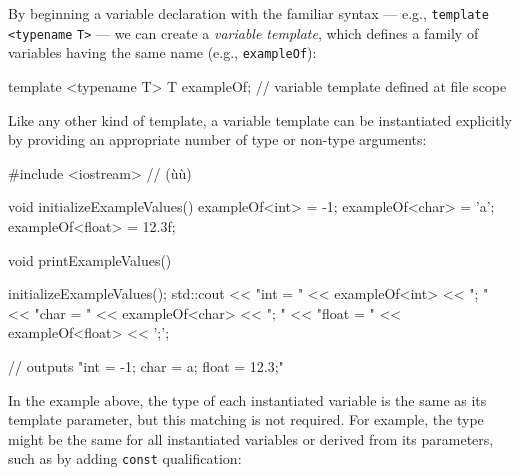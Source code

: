 By beginning a variable declaration with the familiar  syntax --- e.g., \lstinline!template! \lstinline!<typename! \lstinline!T>! --- we can create a \emph{variable template}, which defines a family of variables
having the same name (e.g., \lstinline!exampleOf!):

\begin{emcppslisting}[emcppsbatch=e1]
template <typename T> T exampleOf;  // variable template defined at file scope
\end{emcppslisting}

\noindent Like any other kind of template, a variable template can be instantiated explicitly by
providing an appropriate number of type or non-type arguments:

\begin{emcppslisting}[emcppsbatch=e1]
#include <iostream>  // (ù{}ù)

void initializeExampleValues()
{
    exampleOf<int>   = -1;
    exampleOf<char>  = 'a';
    exampleOf<float> = 12.3f;
}

void printExampleValues()
{
    initializeExampleValues();
    std::cout << "int = "   << exampleOf<int>   << "; "
              << "char = "  << exampleOf<char>  << "; "
              << "float = " << exampleOf<float> << ';';

    // outputs "int = -1; char = a; float = 12.3;"
}
\end{emcppslisting}

\noindent In the example above, the type of each instantiated variable is the same as its template parameter, but this matching is not required. For example, the type might be the same for all instantiated variables or derived from its parameters, such as by adding \lstinline!const! qualification:

